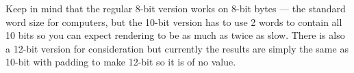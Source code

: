 Keep in mind that the regular 8-bit version works on 8-bit bytes --- the standard word size for computers, but the 10-bit version has to use 2 words to contain all 10 bits so you can expect rendering to be as much as twice as slow.  
There is also a 12-bit version for consideration but currently the results are simply the same as 10-bit with padding to make 12-bit so it is of no value.

















